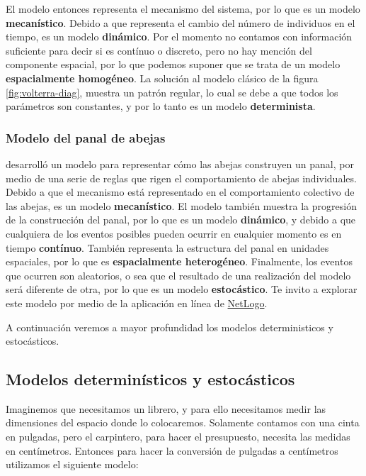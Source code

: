 \documentclass[
]{book}
\begin{document}
El modelo entonces representa el mecanismo del sistema, por lo que es un modelo \textbf{mecanístico}. Debido a que representa el cambio del número de individuos en el tiempo, es un modelo \textbf{dinámico}. Por el momento no contamos con información suficiente para decir si es contínuo o discreto, pero no hay mención del componente espacial, por lo que podemos suponer que se trata de un modelo \textbf{espacialmente homogéneo}. La solución al modelo clásico de la figura \ref{fig:volterra-diag}, muestra un patrón regular, lo cual se debe a que todos los parámetros son constantes, y por lo tanto es un modelo \textbf{determinista}.

\hypertarget{modelo-del-panal-de-abejas}{%
\subsubsection{Modelo del panal de abejas}\label{modelo-del-panal-de-abejas}}

\citet{wilenski2003honey} desarrolló un modelo para representar cómo las abejas construyen un panal, por medio de una serie de reglas que rigen el comportamiento de abejas individuales. Debido a que el mecanismo está representado en el comportamiento colectivo de las abejas, es un modelo \textbf{mecanístico}. El modelo también muestra la progresión de la construcción del panal, por lo que es un modelo \textbf{dinámico}, y debido a que cualquiera de los eventos posibles pueden ocurrir en cualquier momento es en tiempo \textbf{contínuo}. También representa la estructura del panal en unidades espaciales, por lo que es \textbf{espacialmente heterogéneo}. Finalmente, los eventos que ocurren son aleatorios, o sea que el resultado de una realización del modelo será diferente de otra, por lo que es un modelo \textbf{estocástico}. Te invito a explorar este modelo por medio de la aplicación en línea de \href{https://www.netlogoweb.org/launch\#https://www.netlogoweb.org/assets/modelslib/Sample\%20Models/Biology/Honeycomb.nlogo}{NetLogo}.

A continuación veremos a mayor profundidad los modelos deterministicos y estocásticos.

\hypertarget{modelos-determinuxedsticos-y-estocuxe1sticos}{%
\subsection{Modelos determinísticos y estocásticos}\label{modelos-determinuxedsticos-y-estocuxe1sticos}}

Imaginemos que necesitamos un librero, y para ello necesitamos medir las dimensiones del espacio donde lo colocaremos. Solamente contamos con una cinta en pulgadas, pero el carpintero, para hacer el presupuesto, necesita las medidas en centímetros. Entonces para hacer la conversión de pulgadas a centímetros utilizamos el siguiente modelo:
\end{document}
